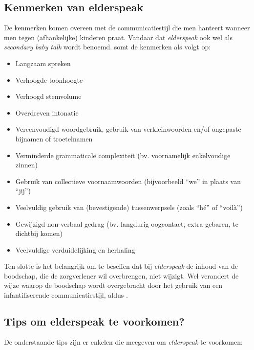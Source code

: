 \subsection{Kenmerken van elderspeak}
De kenmerken komen overeen met de communicatiestijl die men hanteert wanneer men tegen (afhankelijke) kinderen praat. Vandaar dat \textit{elderspeak} ook wel als \textit{secondary baby talk} wordt benoemd. \textcite{Campens2021} somt de kenmerken als volgt op:

\begin{itemize}
    \item Langzaam spreken
    \item Verhoogde toonhoogte
    \item Verhoogd stemvolume
    \item Overdreven intonatie
    \item Vereenvoudigd woordgebruik, gebruik van verkleinwoorden en/of ongepaste bijnamen of troetelnamen
    \item Verminderde grammaticale complexiteit (bv. voornamelijk enkelvoudige zinnen)
    \item Gebruik van collectieve voornaamwoorden (bijvoorbeeld ``we'' in plaats van ``jij'')
    \item Veelvuldig gebruik van (bevestigende) tussenwerpsels (zoals ``hé'' of ``voilà'')
    \item Gewijzigd non-verbaal gedrag (bv. langdurig oogcontact, extra gebaren, te dichtbij komen)
    \item Veelvuldige verduidelijking en herhaling
\end{itemize}

Ten slotte is het belangrijk om te beseffen dat bij \textit{elderspeak} de inhoud van de boodschap, die de zorgverlener wil overbrengen, niet wijzigt. Wel verandert de wijze waarop de boodschap wordt overgebracht door het gebruik van een infantiliserende communicatiestijl, aldus \textcite{Campens2021}.

\subsection{Tips om elderspeak te voorkomen?}

De onderstaande tips zijn er enkelen die \textcite{Wick2007} meegeven om \textit{elderspeak} te voorkomen:

